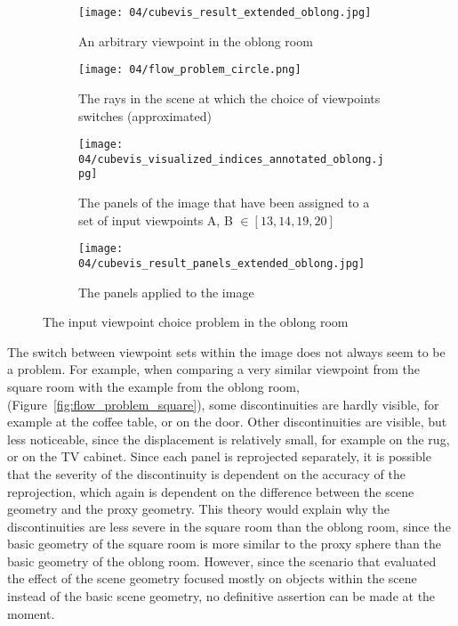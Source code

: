 \begin{figure}
\centering
    \hfill
    \begin{subfigure}[c]{0.45\textwidth}
            \centering
            \texttt{[image: 04/cubevis\_result\_extended\_oblong.jpg]}
            \caption{An arbitrary viewpoint in the oblong room}
    \end{subfigure}
    \hfill
    \begin{subfigure}[c]{0.45\textwidth}
            \centering
            \texttt{[image: 04/flow\_problem\_circle.png]}
            \caption{The rays in the scene at which the choice of viewpoints switches (approximated)}
    \end{subfigure}
    \hfill

    \hfill
    \begin{subfigure}[c]{0.45\textwidth}
            \centering
            \texttt{[image: 04/cubevis\_visualized\_indices\_annotated\_oblong.jpg]}
            \caption{The panels of the image that have been assigned to a set of input viewpoints A, B $\in [13, 14, 19, 20]$}
    \end{subfigure}
    \hfill
    \begin{subfigure}[c]{0.45\textwidth}
            \centering
            \texttt{[image: 04/cubevis\_result\_panels\_extended\_oblong.jpg]}
            \caption{The panels applied to the image}
    \end{subfigure}
    \hfill
  \caption{The input viewpoint choice problem in the oblong room} \label{fig:flow_problem_oblong}
\end{figure}

The switch between viewpoint sets within the image does not always seem to be a problem. For example, when comparing a very similar viewpoint from the square room with the example from the oblong room, (Figure~\ref{fig:flow_problem_square}), some discontinuities are hardly visible, for example at the coffee table, or on the door. Other discontinuities are visible, but less noticeable, since the displacement is relatively small, for example on the rug, or on the TV cabinet.
Since each panel is reprojected separately, it is possible that the severity of the discontinuity is dependent on the accuracy of the reprojection, which again is dependent on the difference between the scene geometry and the proxy geometry.
This theory would explain why the discontinuities are less severe in the square room than the oblong room, since the basic geometry of the square room is more similar to the proxy sphere than the basic geometry of the oblong room.
However, since the scenario that evaluated the effect of the scene geometry focused mostly on objects within the scene instead of the basic scene geometry, no definitive assertion can be made at the moment. %

